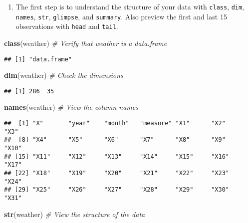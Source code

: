 \documentclass[]{article}
\newenvironment{Shaded}{\begin{snugshade}}{\end{snugshade}}
\newcommand{\KeywordTok}[1]{\textcolor[rgb]{0.13,0.29,0.53}{\textbf{#1}}}
\newcommand{\CommentTok}[1]{\textcolor[rgb]{0.56,0.35,0.01}{\textit{#1}}}
\newcommand{\NormalTok}[1]{#1}
\providecommand{\tightlist}{%
  \setlength{\itemsep}{0pt}\setlength{\parskip}{0pt}}
\begin{document}
\begin{enumerate}
\def\labelenumi{\arabic{enumi}.}
\setcounter{enumi}{1}
\tightlist
\item
  The first step is to understand the structure of your data with
  \texttt{class}, \texttt{dim}, \texttt{names}, \texttt{str},
  \texttt{glimpse}, and \texttt{summary}. Also preview the first and
  last 15 observations with \texttt{head} and \texttt{tail}.
\end{enumerate}

\begin{Shaded}
\begin{Highlighting}[]
\KeywordTok{class}\NormalTok{(weather) }\CommentTok{# Verify that weather is a data.frame}
\end{Highlighting}
\end{Shaded}

\begin{verbatim}
## [1] "data.frame"
\end{verbatim}

\begin{Shaded}
\begin{Highlighting}[]
\KeywordTok{dim}\NormalTok{(weather) }\CommentTok{# Check the dimensions}
\end{Highlighting}
\end{Shaded}

\begin{verbatim}
## [1] 286  35
\end{verbatim}

\begin{Shaded}
\begin{Highlighting}[]
\KeywordTok{names}\NormalTok{(weather) }\CommentTok{# View the column names}
\end{Highlighting}
\end{Shaded}

\begin{verbatim}
##  [1] "X"       "year"    "month"   "measure" "X1"      "X2"      "X3"     
##  [8] "X4"      "X5"      "X6"      "X7"      "X8"      "X9"      "X10"    
## [15] "X11"     "X12"     "X13"     "X14"     "X15"     "X16"     "X17"    
## [22] "X18"     "X19"     "X20"     "X21"     "X22"     "X23"     "X24"    
## [29] "X25"     "X26"     "X27"     "X28"     "X29"     "X30"     "X31"
\end{verbatim}

\begin{Shaded}
\begin{Highlighting}[]
\KeywordTok{str}\NormalTok{(weather) }\CommentTok{# View the structure of the data}
\end{Highlighting}
\end{Shaded}
\end{document}
